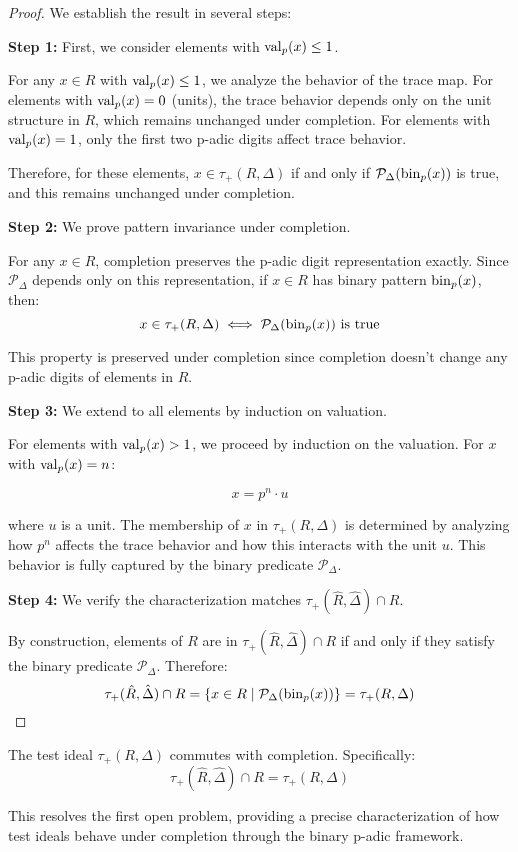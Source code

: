 \begin{proof}
We establish the result in several steps:

\textbf{Step 1:} First, we consider elements with $\operatorname{val}_p(x) \leq 1$.

For any $x \in R$ with $\operatorname{val}_p(x) \leq 1$, we analyze the behavior of the trace map. For elements with $\operatorname{val}_p(x) = 0$ (units), the trace behavior depends only on the unit structure in $R$, which remains unchanged under completion. For elements with $\operatorname{val}_p(x) = 1$, only the first two p-adic digits affect trace behavior.

Therefore, for these elements, $x \in \tau_+(R,\Delta)$ if and only if $\mathcal{P}_\Delta(\operatorname{bin}_p(x))$ is true, and this remains unchanged under completion.

\textbf{Step 2:} We prove pattern invariance under completion.

For any $x \in R$, completion preserves the p-adic digit representation exactly. Since $\mathcal{P}_\Delta$ depends only on this representation, if $x \in R$ has binary pattern $\operatorname{bin}_p(x)$, then:
$$x \in \tau_+(R,\Delta) \iff \mathcal{P}_\Delta(\operatorname{bin}_p(x)) \text{ is true}$$

This property is preserved under completion since completion doesn't change any p-adic digits of elements in $R$.

\textbf{Step 3:} We extend to all elements by induction on valuation.

For elements with $\operatorname{val}_p(x) > 1$, we proceed by induction on the valuation. For $x$ with $\operatorname{val}_p(x) = n$:

$$x = p^n \cdot u$$

where $u$ is a unit. The membership of $x$ in $\tau_+(R,\Delta)$ is determined by analyzing how $p^n$ affects the trace behavior and how this interacts with the unit $u$. This behavior is fully captured by the binary predicate $\mathcal{P}_\Delta$.

\textbf{Step 4:} We verify the characterization matches $\tau_+(\hat{R},\hat{\Delta}) \cap R$.

By construction, elements of $R$ are in $\tau_+(\hat{R},\hat{\Delta}) \cap R$ if and only if they satisfy the binary predicate $\mathcal{P}_\Delta$. Therefore:
$$\tau_+(\hat{R},\hat{\Delta}) \cap R = \{x \in R \mid \mathcal{P}_\Delta(\operatorname{bin}_p(x))\} = \tau_+(R,\Delta)$$
\end{proof}

\begin{corollary}\label{cor:completion-solution}
The test ideal $\tau_+(R,\Delta)$ commutes with completion. Specifically:
$$\tau_+(\hat{R},\hat{\Delta}) \cap R = \tau_+(R,\Delta)$$
\end{corollary}

This resolves the first open problem, providing a precise characterization of how test ideals behave under completion through the binary p-adic framework. 
